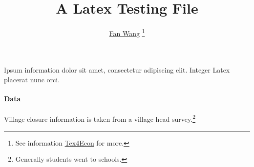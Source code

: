 \documentclass[12pt,english]{article}
\begin{document}
\title{A Latex Testing File}
\author{\href{http://fanwangecon.github.io/}{Fan Wang} \thanks{See information \href{https://fanwangecon.github.io/Tex4Econ/}{Tex4Econ} for more.}}
\maketitle
Ipsum information dolor sit amet, consectetur adipiscing elit. Integer Latex placerat nunc orci.
\paragraph{\href{https://papers.ssrn.com/sol3/papers.cfm?abstract_id=3140132}{Data}}
Village closure information is taken from a village head survey.\footnote{Generally students went to schools.}
\end{document}
